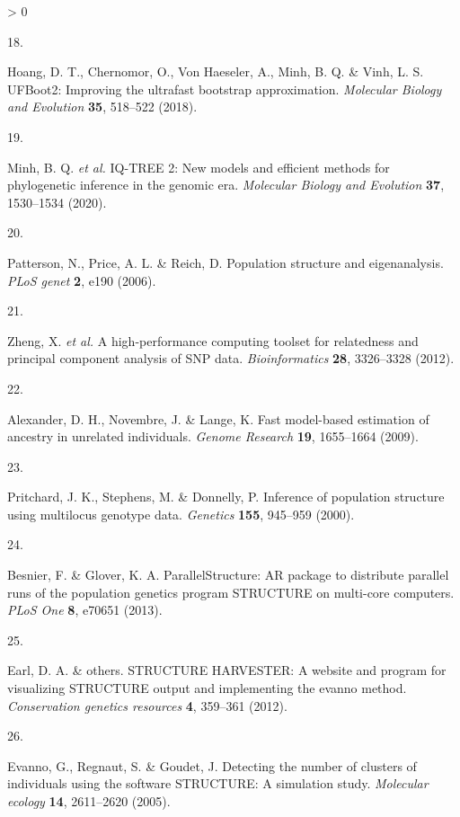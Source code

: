 \documentclass[
  11pt,
]{article}
\newlength{\cslhangindent}
\newlength{\csllabelwidth}
\newenvironment{CSLReferences}[2] %
 {%
  \setlength{\parindent}{0pt}
  \ifodd #1 \everypar{\setlength{\hangindent}{\cslhangindent}}\ignorespaces\fi
  \ifnum #2 > 0
  \setlength{\parskip}{#2\baselineskip}
  \fi
 }%
 {}
\newcommand{\CSLLeftMargin}[1]{\parbox[t]{\csllabelwidth}{#1}}
\newcommand{\CSLRightInline}[1]{\parbox[t]{\linewidth - \csllabelwidth}{#1}\break}
\begin{document}
\begin{CSLReferences}{0}{0}
\leavevmode\hypertarget{ref-hoang2018ufboot2}{}%
\CSLLeftMargin{18. }
\CSLRightInline{Hoang, D. T., Chernomor, O., Von Haeseler, A., Minh, B. Q. \& Vinh, L. S. UFBoot2: Improving the ultrafast bootstrap approximation. \emph{Molecular Biology and Evolution} \textbf{35}, 518--522 (2018).}

\leavevmode\hypertarget{ref-minh2020iq}{}%
\CSLLeftMargin{19. }
\CSLRightInline{Minh, B. Q. \emph{et al.} IQ-TREE 2: New models and efficient methods for phylogenetic inference in the genomic era. \emph{Molecular Biology and Evolution} \textbf{37}, 1530--1534 (2020).}

\leavevmode\hypertarget{ref-patterson2006population}{}%
\CSLLeftMargin{20. }
\CSLRightInline{Patterson, N., Price, A. L. \& Reich, D. Population structure and eigenanalysis. \emph{PLoS genet} \textbf{2}, e190 (2006).}

\leavevmode\hypertarget{ref-zheng2012high}{}%
\CSLLeftMargin{21. }
\CSLRightInline{Zheng, X. \emph{et al.} A high-performance computing toolset for relatedness and principal component analysis of SNP data. \emph{Bioinformatics} \textbf{28}, 3326--3328 (2012).}

\leavevmode\hypertarget{ref-alexander2009admixture}{}%
\CSLLeftMargin{22. }
\CSLRightInline{Alexander, D. H., Novembre, J. \& Lange, K. {Fast model-based estimation of ancestry in unrelated individuals}. \emph{Genome Research} \textbf{19}, 1655--1664 (2009).}

\leavevmode\hypertarget{ref-pritchard2000inference}{}%
\CSLLeftMargin{23. }
\CSLRightInline{Pritchard, J. K., Stephens, M. \& Donnelly, P. Inference of population structure using multilocus genotype data. \emph{Genetics} \textbf{155}, 945--959 (2000).}

\leavevmode\hypertarget{ref-besnier2013parallelstructure}{}%
\CSLLeftMargin{24. }
\CSLRightInline{Besnier, F. \& Glover, K. A. ParallelStructure: AR package to distribute parallel runs of the population genetics program STRUCTURE on multi-core computers. \emph{PLoS One} \textbf{8}, e70651 (2013).}

\leavevmode\hypertarget{ref-earl2012structure}{}%
\CSLLeftMargin{25. }
\CSLRightInline{Earl, D. A. \& others. STRUCTURE HARVESTER: A website and program for visualizing STRUCTURE output and implementing the evanno method. \emph{Conservation genetics resources} \textbf{4}, 359--361 (2012).}

\leavevmode\hypertarget{ref-evanno2005detecting}{}%
\CSLLeftMargin{26. }
\CSLRightInline{Evanno, G., Regnaut, S. \& Goudet, J. Detecting the number of clusters of individuals using the software STRUCTURE: A simulation study. \emph{Molecular ecology} \textbf{14}, 2611--2620 (2005).}


\end{CSLReferences}
\end{document}
